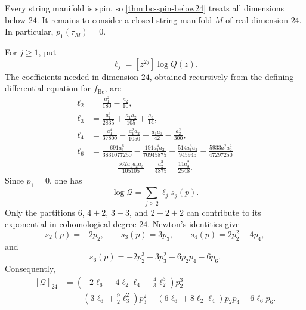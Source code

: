 \documentclass[14pt,dvipsnames]{extarticle}
\makeatletter
\numberwithin{equation}{subsection}
\theoremstyle{plain}
\theoremstyle{definition}
\theoremstyle{definition}
\renewenvironment{proof}[1][\proofname]{
 \par\pushQED{\qed}\normalfont
 \topsep6\p@\@plus6\p@\relax
 \trivlist\item[\hskip\labelsep\bfseries\itshape #1\@addpunct{.}]
}{\popQED\endtrivlist\@endpefalse}
\newcommand{\Bc}{\mathrm{Bc}}
\makeatother
\begin{document}
\begin{proof}[Proof of \cref{thm:bc-string-through24}]
Every string manifold is spin, so \cref{thm:bc-spin-below24} treats all
dimensions below $24$. It remains to consider a closed string manifold $M$ of
real dimension $24$. In particular, $p_1(\tau_M)=0$.

For $j\geq1$, put
\[
 \ell_j=[z^{2j}]\log Q(z).
\]
The coefficients needed in dimension $24$, obtained recursively from the
defining differential equation for $f_{\Bc}$, are
\begin{equation}\label{eq:string-log-coefficients}
\begin{aligned}
 \ell_2&=\frac{a_1^2}{180}-\frac{a_2}{10},\\
 \ell_3&=\frac{a_1^3}{2835}+\frac{a_1a_2}{105}
          +\frac{a_3}{14},\\
 \ell_4&=\frac{a_1^4}{37800}-\frac{a_1^2a_2}{1050}
          -\frac{a_1a_3}{42}-\frac{a_2^2}{300},\\
 \ell_6&=\frac{691a_1^6}{3831077250}
          -\frac{191a_1^4a_2}{70945875}
          -\frac{514a_1^3a_3}{945945}
          -\frac{5933a_1^2a_2^2}{47297250}\\
 &\hspace{2em}{}
          -\frac{562a_1a_2a_3}{105105}
          -\frac{a_2^3}{4875}
          -\frac{11a_3^2}{2548}.
\end{aligned}
\end{equation}
Since $p_1=0$, one has
\[
 \log\mathcal Q=\sum_{j\geq2}\ell_js_j(p).
\]
Only the partitions $6$, $4+2$, $3+3$, and $2+2+2$ can contribute to its
exponential in cohomological degree $24$. Newton's identities give
\[
 s_2(p)=-2p_2,\qquad s_3(p)=3p_3,\qquad
 s_4(p)=2p_2^2-4p_4,
\]
and
\[
 s_6(p)=-2p_2^3+3p_3^2+6p_2p_4-6p_6.
\]
Consequently,
\begin{equation}\label{eq:string-degree24-class}
\begin{aligned}
 [\mathcal Q]_{24}
 &=\left(-2\ell_6-4\ell_2\ell_4-\frac43\ell_2^3\right)p_2^3\\
 &\quad+\left(3\ell_6+\frac92\ell_3^2\right)p_3^2
       +\left(6\ell_6+8\ell_2\ell_4\right)p_2p_4
       -6\ell_6p_6.
\end{aligned}
\end{equation}


\end{proof}
\end{document}
